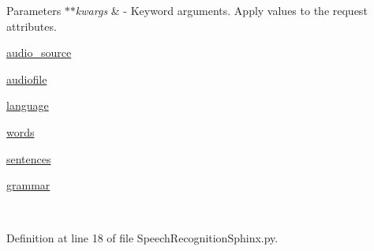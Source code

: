\begin{DoxyParams}{Parameters}
{\em $\ast$$\ast$kwargs} & -\/ Keyword arguments. Apply values to the request attributes.
\begin{DoxyItemize}
\item \hyperlink{classRappCloud_1_1CloudMsgs_1_1SpeechRecognitionSphinx_1_1SpeechRecognitionSphinx_1_1Request_a72a2d7ca799d9b01aa6e6bf9bb8ca8bd}{audio\-\_\-source}
\item \hyperlink{classRappCloud_1_1CloudMsgs_1_1SpeechRecognitionSphinx_1_1SpeechRecognitionSphinx_1_1Request_a92f77c3f113ec79ef2983c68c5c975f5}{audiofile}
\item \hyperlink{classRappCloud_1_1CloudMsgs_1_1SpeechRecognitionSphinx_1_1SpeechRecognitionSphinx_1_1Request_ab0ae85efc663177ca81f7197f8a18606}{language}
\item \hyperlink{classRappCloud_1_1CloudMsgs_1_1SpeechRecognitionSphinx_1_1SpeechRecognitionSphinx_1_1Request_a53b695c6df5781eadffdf0c633b48f91}{words}
\item \hyperlink{classRappCloud_1_1CloudMsgs_1_1SpeechRecognitionSphinx_1_1SpeechRecognitionSphinx_1_1Request_aa24acc8a7cc67efde78f2ebebf2163e7}{sentences}
\item \hyperlink{classRappCloud_1_1CloudMsgs_1_1SpeechRecognitionSphinx_1_1SpeechRecognitionSphinx_1_1Request_a6a4e3a439858eecc8f34d1b90819fa57}{grammar} 
\end{DoxyItemize}\\
\hline
\end{DoxyParams}


Definition at line 18 of file Speech\-Recognition\-Sphinx.\-py.



